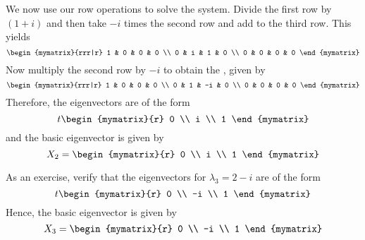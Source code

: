 \begin{solution}
We now use our row operations to solve the system.
Divide the first row by $(1+i) $ and then take
$-i$ times the second row and add to the third row. This yields
\begin{equation*}
\begin{mymatrix}{rrr|r}
1 & 0 & 0 & 0 \\
0 & i & 1 & 0 \\
0 & 0 & 0 & 0
\end{mymatrix}
\end{equation*}
Now multiply the second row by $-i$ to obtain the {\rref}, given by
\begin{equation*}
\begin{mymatrix}{rrr|r}
1 & 0 &  0 & 0 \\
0 & 1 & -i & 0 \\
0 & 0 &  0 & 0
\end{mymatrix}
\end{equation*}
Therefore, the eigenvectors are of the form
\begin{equation*}
t\begin{mymatrix}{r}
0 \\
i \\
1
\end{mymatrix}
\end{equation*}
and the basic eigenvector is given by
\begin{equation*}
X_2 =
\begin{mymatrix}{r}
0 \\
i \\
1
\end{mymatrix}
\end{equation*}

As an exercise, verify that the eigenvectors for $\lambda_3 =2-i$ are of the form
\begin{equation*}
t\begin{mymatrix}{r}
 0 \\
-i \\
 1
\end{mymatrix}
\end{equation*}
Hence, the basic eigenvector is given by
\begin{equation*}
X_3 = \begin{mymatrix}{r}
 0 \\
-i \\
 1
\end{mymatrix}
\end{equation*}


\end{solution}
